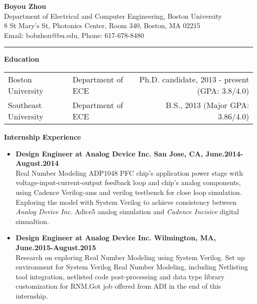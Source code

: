 \documentclass[]{article}
\begin{document}
\pagestyle{empty}
\begin{center}
{\large\textbf{Boyou Zhou}}\\
Department of Electrical and Computer Engineering, Boston University\\
8 St Mary's St, Photonics Center, Room 340, Boston, MA 02215\\
Email: bobzhou@bu.edu, Phone: 617-678-8480\\
\rule[-0.1cm]{7.5in}{0.01cm}
\end{center}
%

\textbf{Education}
\begin{table*}[h]
  \begin{tabular}{p{2.0in}p{2.0in}r}
    Boston University& Department of ECE & Ph.D. candidate, 2013 - present
    (GPA: 3.8/4.0)\\ 
    Southeast University & Department of ECE & B.S., 2013
    (Major GPA: 3.86/4.0)\\ 
  \end{tabular}
  \label{tbl:1}
\end{table*}

\noindent \textbf{Internship Experience}
    \begin{itemize}
        \item \textbf{Design Engineer at Analog Device Inc. San Jose, CA, June.2014-August.2014}\\
        Real Number Modeling ADP1048 PFC chip's application power stage with
        voltage-input-current-output feedback loop and chip's analog components, using Cadence
        Verilog-ams and verilog testbench for close loop simulation. Exploring the model with System
        Verilog to achieve consistency between \textit{Analog Device Inc.} Adice5 analog simulation
        and \textit{Cadence Incisive} digital simualtion. 
        \item \textbf{Design Engineer at Analog Device Inc. Wilmington, MA, June.2015-August.2015}\\
        Research on exploring Real Number Modeling using System Verilog. Set up environment for
        System Verilog Real Number Modeling, including Netlisting tool integration, netlisted code
        post-processing and data type library customization for RNM.\@ Got job
        offered from ADI in the end of this internship.
    \end{itemize}
\end{document}
